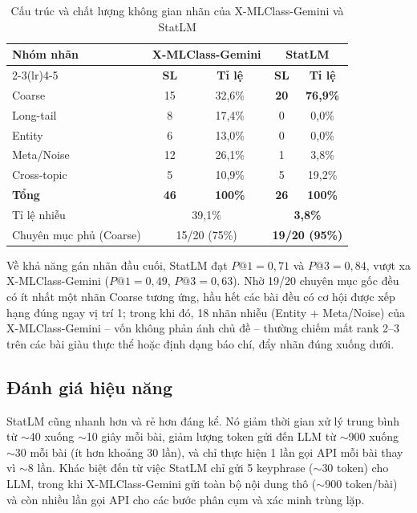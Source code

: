 \begin{table}[!t]
\renewcommand{\arraystretch}{1.2}
\caption{Cấu trúc và chất lượng không gian nhãn của X-MLClass-Gemini và StatLM}
\label{tab:labelspace}
\centering
\footnotesize
\begin{tabular}{@{}lcccc@{}}
\toprule
\multirow{2}{*}{\textbf{Nhóm nhãn}} & \multicolumn{2}{c}{\textbf{X-MLClass-Gemini}} & \multicolumn{2}{c}{\textbf{StatLM}} \\
\cmidrule(lr){2-3}\cmidrule(lr){4-5}
 & \textbf{SL} & \textbf{Tỉ lệ} & \textbf{SL} & \textbf{Tỉ lệ} \\
\midrule
Coarse      & 15 & 32,6\% & \textbf{20} & \textbf{76,9\%} \\
Long-tail   &  8 & 17,4\% &  0 &  0,0\% \\
Entity      &  6 & 13,0\% &  0 &  0,0\% \\
Meta/Noise  & 12 & 26,1\% &  1 &  3,8\% \\
Cross-topic &  5 & 10,9\% &  5 & 19,2\% \\
\midrule
\textbf{Tổng} & \textbf{46} & \textbf{100\%} & \textbf{26} & \textbf{100\%} \\
\midrule
Tỉ lệ nhiễu              & \multicolumn{2}{c}{39,1\%} & \multicolumn{2}{c}{\textbf{3,8\%}} \\
Chuyên mục phủ (Coarse)  & \multicolumn{2}{c}{15/20 (75\%)} & \multicolumn{2}{c}{\textbf{19/20 (95\%)}} \\
\bottomrule
\end{tabular}
\end{table}

Về khả năng gán nhãn đầu cuối, StatLM đạt $P@1=0{,}71$ và $P@3=0{,}84$, vượt xa
X-MLClass-Gemini ($P@1=0{,}49$, $P@3=0{,}63$). Nhờ 19/20 chuyên mục gốc đều có ít nhất một
nhãn Coarse tương ứng, hầu hết các bài đều có cơ hội được xếp hạng đúng ngay vị
trí 1; trong khi đó, 18 nhãn nhiễu (Entity + Meta/Noise) của X-MLClass-Gemini -- vốn không
phản ánh chủ đề -- thường chiếm mất rank 2--3 trên các bài giàu thực thể hoặc định
dạng báo chí, đẩy nhãn đúng xuống dưới.

\subsection{Đánh giá hiệu năng}
StatLM cũng nhanh hơn và rẻ hơn đáng kể. Nó giảm thời gian xử lý trung bình từ
$\sim$40 xuống $\sim$10 giây mỗi bài, giảm lượng token gửi đến LLM từ $\sim$900
xuống $\sim$30 mỗi bài (ít hơn khoảng 30 lần), và chỉ thực hiện 1 lần gọi API mỗi
bài thay vì $\sim$8 lần. Khác biệt đến từ việc StatLM chỉ gửi 5 keyphrase
($\sim$30 token) cho LLM, trong khi X-MLClass-Gemini gửi toàn bộ nội dung thô ($\sim$900
token/bài) và còn nhiều lần gọi API cho các bước phân cụm và xác minh trùng lặp.

